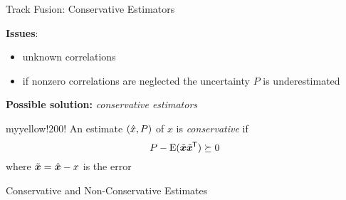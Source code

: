 \documentclass[aspectratio=1610]{beamer}
\begin{document}
\begin{frame}{Track Fusion: Conservative Estimators}

\textbf{Issues}:
\begin{itemize}
    \item unknown correlations
    \item if nonzero correlations are neglected the uncertainty $P$ is underestimated
\end{itemize}

\textbf{Possible solution:} \emph{conservative estimators}

\begin{rfshadedcolorbox}[title={Conservative Estimate}]{myyellow!200!}
    An estimate $(\xhat,P)$ of $x$ is \emph{conservative} if
    \begin{equation*}
        P - \EV(\tbfx\tbfx\trnsp) \succeq 0
    \end{equation*}
    where $\tbfx=\hbfx-x$ is the error
\end{rfshadedcolorbox}

\end{frame}


\begin{frame}{Conservative and Non-Conservative Estimates}

\begin{figure}
    \begin{tikzpicture}[scale=.5]
        
    \end{tikzpicture}
\end{figure}

\end{frame}
\end{document}
